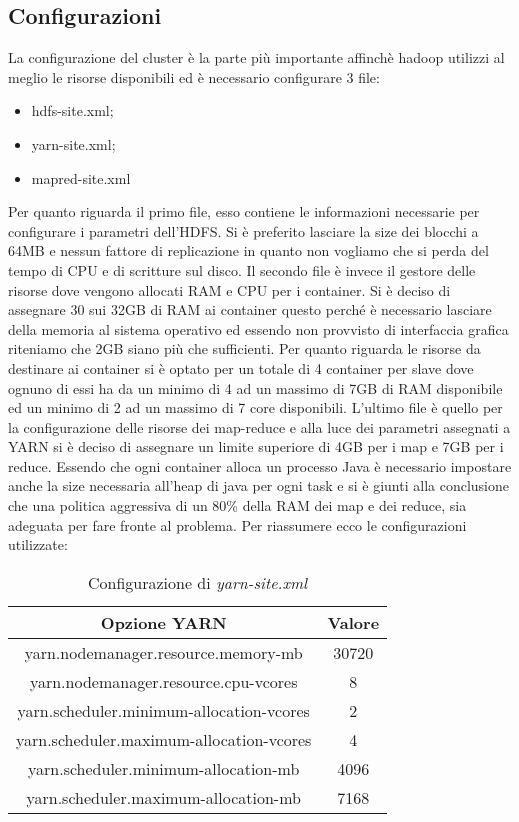 \subsection{Configurazioni}
La configurazione del cluster è la parte più importante affinchè hadoop utilizzi al meglio le risorse disponibili ed è necessario configurare 3 file:
\begin{itemize}
	\item hdfs-site.xml;
	\item yarn-site.xml;
	\item mapred-site.xml
\end{itemize}
Per quanto riguarda il primo file, esso contiene le informazioni necessarie per configurare i parametri dell'HDFS. Si è preferito lasciare la size dei blocchi a 64MB e nessun fattore di replicazione in quanto non vogliamo che si perda del tempo di CPU e di scritture sul disco. Il secondo file è invece il gestore delle risorse dove vengono allocati RAM e CPU per i container. Si è deciso di assegnare 30 sui 32GB di RAM ai container questo perché è necessario lasciare della memoria al sistema operativo ed essendo non provvisto di interfaccia grafica riteniamo che 2GB siano più che sufficienti. Per quanto riguarda le risorse da destinare ai container si è optato per un totale di 4 container per slave dove ognuno di essi ha da un minimo di 4 ad un massimo di 7GB di RAM disponibile ed un minimo di 2 ad un massimo di 7 core disponibili. L'ultimo file è quello per la configurazione delle risorse dei map-reduce e alla luce dei parametri assegnati a YARN si è deciso di assegnare un limite superiore di 4GB per i map e 7GB per i reduce. Essendo che ogni container alloca un processo Java è necessario impostare anche la size necessaria all'heap di java per ogni task e si è giunti alla conclusione che una politica aggressiva di un 80\% della RAM dei map e dei reduce, sia adeguata per fare fronte al problema. Per riassumere ecco le configurazioni utilizzate:
\begin{table}[H]
	\begin{center}
		\begin{tabular}{ | c | c |}
			\hline
			\textbf{Opzione YARN}                    & \textbf{Valore} \\
			\hline
			yarn.nodemanager.resource.memory-mb      & 30720           \\
			\hline
			yarn.nodemanager.resource.cpu-vcores     & 8               \\
			\hline
			yarn.scheduler.minimum-allocation-vcores & 2               \\
			\hline
			yarn.scheduler.maximum-allocation-vcores & 4               \\
			\hline
			yarn.scheduler.minimum-allocation-mb     & 4096            \\
			\hline
			yarn.scheduler.maximum-allocation-mb     & 7168            \\
			\hline
		\end{tabular}
		\caption{Configurazione di \textit{yarn-site.xml}}
	\end{center}
\end{table}
